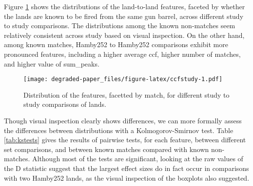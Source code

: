 \documentclass[12pt,]{article}
\theoremstyle{definition}
\theoremstyle{definition}
\theoremstyle{definition}
\theoremstyle{remark}
\begin{document}
Figure \ref{fig:ccfstudy} shows the distributions of the land-to-land
features, faceted by whether the lands are known to be fired from the
same gun barrel, across different study to study comparisons. The
distributions among the known non-matches seem relatively consistent
across study based on visual inspection. On the other hand, among known
matches, Hamby252 to Hamby252 comparisons exhibit more pronounced
features, including a higher average ccf, higher number of matches, and
higher value of sum\_peaks.

\begin{figure}[htbp]
\centering
\texttt{[image: degraded-paper\_files/figure-latex/ccfstudy-1.pdf]}
\caption{\label{fig:ccfstudy}Distribution of the features, facetted by
match, for different study to study comparisons of lands.}
\end{figure}

Though visual inspection clearly shows differences, we can more formally
assess the differences between distributions with a Kolmogorov-Smirnov
test. Table \ref{tab:kstests} gives the results of pairwise tests, for
each feature, between different set comparisons, and between known
matches compared with known non-matches. Although most of the tests are
significant, looking at the raw values of the D statistic suggest that
the largest effect sizes do in fact occur in comparisons with two
Hamby252 lands, as the visual inspection of the boxplots also suggested.
\end{document}
